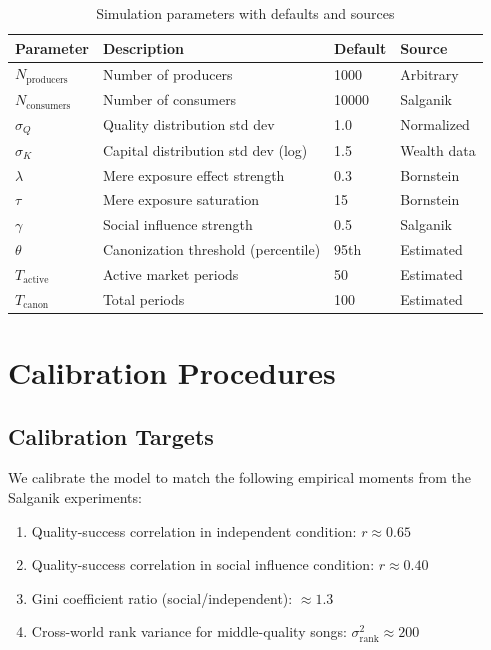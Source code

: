 \documentclass[11pt,a4paper]{article}
\begin{document}
\begin{table}[H]
\centering
\caption{Simulation parameters with defaults and sources}
\label{tab:params}
\begin{tabular}{@{}llll@{}}
\toprule
\textbf{Parameter} & \textbf{Description} & \textbf{Default} & \textbf{Source} \\
\midrule
$N_{\text{producers}}$ & Number of producers & 1000 & Arbitrary \\
$N_{\text{consumers}}$ & Number of consumers & 10000 & Salganik \\
$\sigma_Q$ & Quality distribution std dev & 1.0 & Normalized \\
$\sigma_K$ & Capital distribution std dev (log) & 1.5 & Wealth data \\
$\lambda$ & Mere exposure effect strength & 0.3 & Bornstein \\
$\tau$ & Mere exposure saturation & 15 & Bornstein \\
$\gamma$ & Social influence strength & 0.5 & Salganik \\
$\theta$ & Canonization threshold (percentile) & 95th & Estimated \\
$T_{\text{active}}$ & Active market periods & 50 & Estimated \\
$T_{\text{canon}}$ & Total periods & 100 & Estimated \\
\bottomrule
\end{tabular}
\end{table}

\section{Calibration Procedures}
\label{sec:calibration}

\subsection{Calibration Targets}

We calibrate the model to match the following empirical moments from the Salganik experiments:

\begin{enumerate}
    \item Quality-success correlation in independent condition: $r \approx 0.65$
    \item Quality-success correlation in social influence condition: $r \approx 0.40$
    \item Gini coefficient ratio (social/independent): $\approx 1.3$
    \item Cross-world rank variance for middle-quality songs: $\sigma^2_{\text{rank}} \approx 200$
\end{enumerate}
\end{document}
